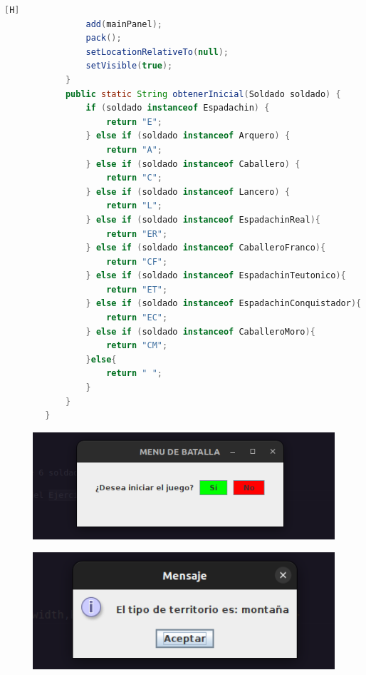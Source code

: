\documentclass{article}
\begin{document}
\begin{lstlisting}[language=java,caption={Las lineas de codigos de la clase BoardView}][H]
				add(mainPanel);
				pack();
				setLocationRelativeTo(null);
				setVisible(true);
			}
			public static String obtenerInicial(Soldado soldado) {
				if (soldado instanceof Espadachin) {
					return "E";
				} else if (soldado instanceof Arquero) {
					return "A";
				} else if (soldado instanceof Caballero) {
					return "C";
				} else if (soldado instanceof Lancero) {
					return "L";
				} else if (soldado instanceof EspadachinReal){
					return "ER";
				} else if (soldado instanceof CaballeroFranco){
					return "CF";
				} else if (soldado instanceof EspadachinTeutonico){
					return "ET";
				} else if (soldado instanceof EspadachinConquistador){
					return "EC";
				} else if (soldado instanceof CaballeroMoro){
					return "CM";
				}else{
					return " ";
				}
			}
		}
	\end{lstlisting}
	\begin{figure}[H]
		\centering
		\includegraphics[width=1.0\textwidth,keepaspectratio]{img/Commit11-1.png}
	\end{figure}
	\begin{figure}[H]
		\centering
		\includegraphics[width=1.0\textwidth,keepaspectratio]{img/Commit12-1.png}
	\end{figure}
\end{document}
